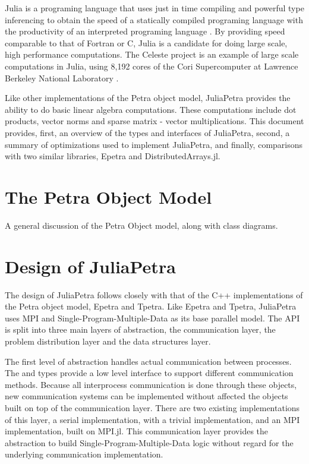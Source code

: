 \documentclass[acmsmall]{acmart}
\newcommand{\snippet}[1]{\texttt{\detokenize{#1}}}
\begin{document}
Julia is a programing language that uses just in time compiling and powerful type inferencing
to obtain the speed of a statically compiled programing language with the productivity of an
interpreted programing language \cite{Bezanson:2017:FreshApproach}.
By providing speed comparable to that of Fortran or C, Julia is a candidate for doing large scale,
high performance computations.
The Celeste project is an example of large scale computations in Julia,
using 8,192 cores of the Cori Supercomputer
at Lawrence Berkeley National Laboratory \cite{Bezanson:2017:FreshApproach}.

Like other implementations of the Petra object model,
JuliaPetra provides the ability to do basic linear algebra computations.
These computations include dot products, vector norms and sparse matrix - vector multiplications.
This document provides, first, an overview of the types and interfaces of JuliaPetra,
second, a summary of optimizations used to implement JuliaPetra,
and finally, comparisons with two similar libraries, Epetra and DistributedArrays.jl.

\section{The Petra Object Model}

A general discussion of the Petra Object model, along with class diagrams.

\section{Design of JuliaPetra}

The design of JuliaPetra follows closely with that of the C++ implementations of the
Petra object model, Epetra and Tpetra.
Like Epetra and Tpetra, JuliaPetra uses MPI and Single-Program-Multiple-Data as its base parallel model.
The API is split into three main layers of abstraction, the communication layer, the problem distribution layer and the data structures layer.

The first level of abstraction handles actual communication between processes.
The \snippet{Comm} and \snippet{Distributor} types provide a low level interface to support different communication methods.
Because all interprocess communication is done through these objects, new communication systems can be implemented without affected the objects built on top of the communication layer.
There are two existing implementations of this layer, a serial implementation, with a trivial implementation, and an MPI implementation, built on MPI.jl\cite{Github:MPI}.
This communication layer provides the abstraction to build Single-Program-Multiple-Data logic without regard for the underlying communication implementation.
\end{document}
